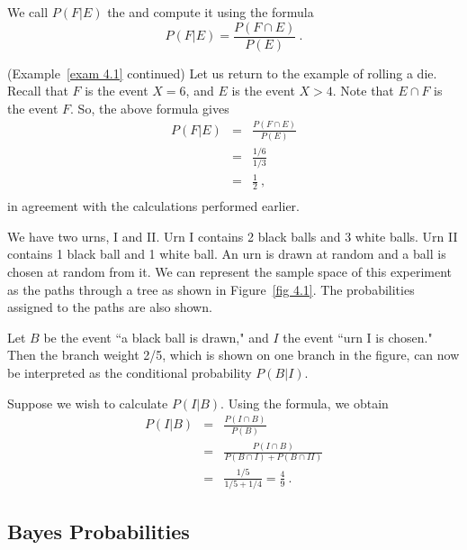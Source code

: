 We call $P(F|E)$ the 
and compute it using the formula
$$
P(F|E) = \frac {P(F \cap E)}{P(E)}\ .
$$

\begin{example}(Example~\ref{exam 4.1} continued){\label{exam 4.3}}
Let us return to the example of rolling a die.  Recall that $F$ is the event $X = 6$, and
$E$ is the event $X > 4$.  Note that $E \cap F$ is the event $F$.  So, the above formula gives
\begin{eqnarray*}
P(F|E) & = & \frac {P(F \cap E)}{P(E)} \\
& = & \frac {1/6}{1/3} \\
& = & \frac 12\ ,\\
\end{eqnarray*}
in agreement with the calculations performed earlier.
\end{example}

\begin{example}\label{exam 4.4}
We have two urns, I and II.  Urn I contains 2 black balls and 3 white balls. 
Urn II contains 1 black ball and 1 white ball.  An urn is drawn at random and a ball
is chosen at random from it.  We can represent the sample space of this experiment as the paths
through a tree as shown in Figure~\ref{fig 4.1}. The probabilities assigned to the paths are
also shown.  
\par
Let $B$ be the event ``a black ball is drawn," and $I$ the event ``urn I is
chosen."  Then the branch weight 2/5, which is shown on one branch in the figure, can now be
interpreted as the conditional probability $P(B|I)$.


\par
Suppose we wish to calculate $P(I|B)$.  Using the formula, we obtain
\begin{eqnarray*}
P(I|B) & = & \frac {P(I \cap B)}{P(B)} \\
       & = & \frac {P(I \cap B)}{P(B \cap I) + P(B \cap II)} \\
       & = & \frac {1/5}{1/5 + 1/4} = \frac 49\ .
\end{eqnarray*}
\end{example}

\subsection*{Bayes Probabilities}

